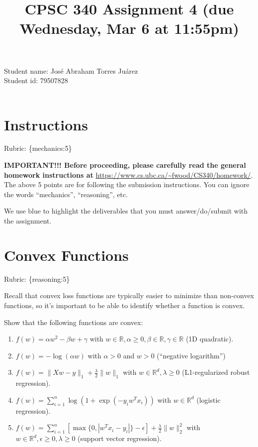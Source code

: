 \documentclass{article}
\def\rubric#1{\gre{Rubric: \{#1\}}}{}
\def\blu#1{{\color{blu}#1}}
\def\gre#1{{\color{gre}#1}}
\def\norm#1{\|#1\|}
\def\ans#1{{\color{ans}#1}}
\def\R{\mathbb{R}}
\def\enum#1{\begin{enumerate}#1\end{enumerate}}
\begin{document}
\title{CPSC 340 Assignment 4 (due Wednesday, Mar 6 at 11:55pm)}
\date{}
\maketitle

\vspace{-4em}
\ans{
    Student name: José Abraham Torres Juárez \\
    Student id: 79507828 \\ \\
}


\section*{Instructions}
\rubric{mechanics:5}

\textbf{IMPORTANT!!! Before proceeding, please carefully read the general homework instructions at} \url{https://www.cs.ubc.ca/~fwood/CS340/homework/}. The above 5 points are for following the submission instructions. You can ignore the words ``mechanics'', ``reasoning'', etc.

\vspace{1em}
We use \blu{blue} to highlight the deliverables that you must answer/do/submit with the assignment.


\section{Convex Functions}
\rubric{reasoning:5}

Recall that convex loss functions are typically easier to minimize than non-convex functions, so it's important to be able to identify whether a function is convex.

\blu{Show that the following functions are convex}:

\enum{
\item $f(w) = \alpha w^2 - \beta w + \gamma$ with $w \in \R, \alpha \geq 0, \beta \in \R, \gamma \in \R$ (1D quadratic).
\item $f(w) = -\log(\alpha w) $ with $\alpha > 0$ and $w > 0$ (``negative logarithm'')
\item $f(w) = \norm{Xw-y}_1 + \frac{\lambda}{2}\norm{w}_1$ with $w \in \R^d, \lambda \geq 0$ (L1-regularized robust regression).
\item $f(w) = \sum_{i=1}^n \log(1+\exp(-y_iw^Tx_i)) $ with $w \in \R^d$ (logistic regression).
\item $f(w) = \sum_{i=1}^n[\max\{0,|w^Tx_i - y_i|\} - \epsilon] + \frac{\lambda}{2}\norm{w}_2^2$  with $w \in \R^d, \epsilon \geq 0, \lambda \geq 0$ (support vector regression).
}
\end{document}
